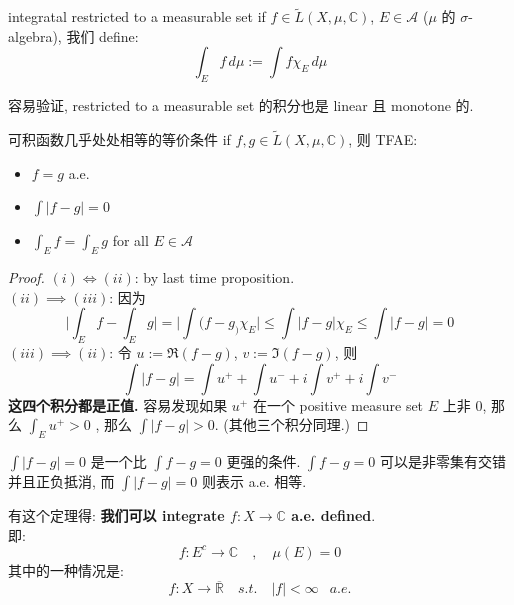 \documentclass[lang=cn,11pt]{elegantbook}
\begin{document}
\begin{definition}{integratal restricted to a measurable set}
    if $f \in \tilde{L}(X, \mu, \mathbb{C})$, $E \in \mathcal{A}$ ($\mu$ 的 $\sigma$-algebra), 我们 define: $$\int_E f   \, d \mu := \int f  \chi_E \, d \mu$$\end{definition}
\begin{remark}
    容易验证, restricted to a measurable set 的积分也是 linear 且 monotone 的.
\end{remark}



\begin{proposition}{可积函数几乎处处相等的等价条件}
    if $f,g \in \tilde{L}(X, \mu, \mathbb{C})$, 则 TFAE: 
    \begin{itemize}
        \item $f=g $ a.e.
        \item $\int |f-g| = 0$
        \item $\int _E f = \int _E g$ for all $E \in \mathcal{A}$
    \end{itemize}
\end{proposition}
\begin{proof}
    $(i) \Longleftrightarrow (ii) $: by last time proposition.\\
    $(ii) \implies (iii)$: 因为 $$
    \Bigg|\int_E f - \int _E g  \Bigg|  = \Bigg| \int (f-g_)\chi_E  \Bigg| \leq \int |f-g| \chi_E \leq \int|f-g| = 0
    $$
    $(iii) \implies (ii)$: 令 $u := \Re (f-g)$, $v := \Im (f-g)$, 则 $$
    \int |f-g| = \int u^+ + \int u^- + i\int v^+ + i\int v^-
    $$
\textbf{这四个积分都是正值. }容易发现如果 $u^+$ 在一个 positive measure set $E$ 上非 0, 那么 $\int_E u^+ > 0$ , 那么 $\int |f-g| > 0$. (其他三个积分同理.)
\end{proof}
\begin{remark}
    $\int |f-g| = 0$ 是一个比 $\int f-g = 0$ 更强的条件. $\int f-g = 0$ 可以是非零集有交错并且正负抵消, 而 $\int |f-g| = 0$ 则表示 a.e. 相等.
    \end{remark}



\begin{remark}
    有这个定理得:\textbf{ 我们可以 integrate $f:X\rightarrow \mathbb{C}$ a.e. defined}.\\
    即: $$
    f: E^c \rightarrow \mathbb{C}\quad , \quad \mu(E) = 0
    $$
    其中的一种情况是: $$
    f: X \rightarrow \overline{\mathbb{R}} \quad s.t. \quad |f| < \infty  \;\;\ a.e.
    $$
\end{remark}
\end{document}
